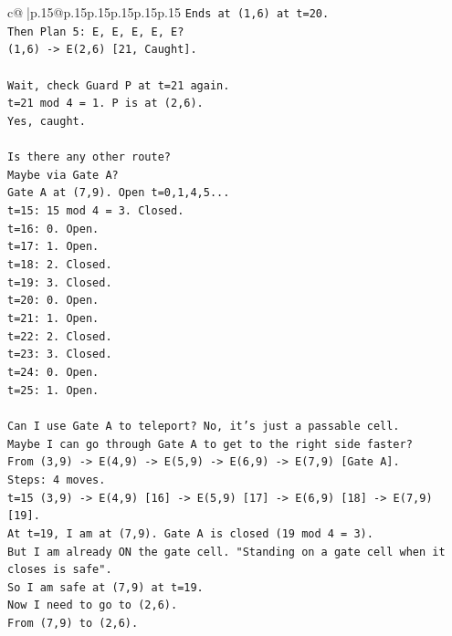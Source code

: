 \documentclass{article}
\begin{document}
{\begin{supertabular}{c@{$\;$}|p{.15\linewidth}@{}p{.15\linewidth}p{.15\linewidth}p{.15\linewidth}p{.15\linewidth}p{.15\linewidth}}
{{{\texttt{Ends at (1,6) at t=20.} \\
\texttt{Then Plan 5: E, E, E, E, E?} \\
\texttt{(1,6) {-}> E(2,6) {[}21, Caught{]}.} \\
\\ 
\texttt{Wait, check Guard P at t=21 again.} \\
\texttt{t=21 mod 4 = 1. P is at (2,6).} \\
\texttt{Yes, caught.} \\
\\ 
\texttt{Is there any other route?} \\
\texttt{Maybe via Gate A?} \\
\texttt{Gate A at (7,9). Open t=0,1,4,5...} \\
\texttt{t=15: 15 mod 4 = 3. Closed.} \\
\texttt{t=16: 0. Open.} \\
\texttt{t=17: 1. Open.} \\
\texttt{t=18: 2. Closed.} \\
\texttt{t=19: 3. Closed.} \\
\texttt{t=20: 0. Open.} \\
\texttt{t=21: 1. Open.} \\
\texttt{t=22: 2. Closed.} \\
\texttt{t=23: 3. Closed.} \\
\texttt{t=24: 0. Open.} \\
\texttt{t=25: 1. Open.} \\
\\ 
\texttt{Can I use Gate A to teleport? No, it's just a passable cell.} \\
\texttt{Maybe I can go through Gate A to get to the right side faster?} \\
\texttt{From (3,9) {-}> E(4,9) {-}> E(5,9) {-}> E(6,9) {-}> E(7,9) {[}Gate A{]}.} \\
\texttt{Steps: 4 moves.} \\
\texttt{t=15 (3,9) {-}> E(4,9) {[}16{]} {-}> E(5,9) {[}17{]} {-}> E(6,9) {[}18{]} {-}> E(7,9) {[}19{]}.} \\
\texttt{At t=19, I am at (7,9). Gate A is closed (19 mod 4 = 3).} \\
\texttt{But I am already ON the gate cell. "Standing on a gate cell when it closes is safe".} \\
\texttt{So I am safe at (7,9) at t=19.} \\
\texttt{Now I need to go to (2,6).} \\
\texttt{From (7,9) to (2,6).} \\
}}}
\end{supertabular}}
\end{document}

